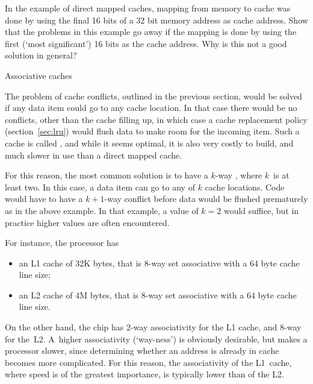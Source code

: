 \begin{exercise}
  In the example of direct mapped caches, mapping from memory to cache
  was done by using the final 16 bits of a 32 bit memory address as
  cache address. Show that the problems in this example go away if the
  mapping is done by using the first (`most significant') 16 bits as
  the cache address. Why is this not a good solution in general?
\end{exercise}

 {Associative caches}
\label{sec:associative}

The problem of cache conflicts, outlined in the previous section, would
be solved if any data item could go to any cache location. In that
case there would be no conflicts, other than the cache filling up, in
which case a cache replacement policy (section~\ref{sec:lru}) would
flush data to make room for the incoming item. Such a cache is called
, and while it seems optimal, it is also
very costly to build, and much slower in use than a direct mapped cache.

For this reason, the most common solution is to have a
$k$-way , where $k$~is at least two. In
this case, a data item can go to any of $k$ cache locations. Code
would have to have a $k+1$-way conflict before data would be flushed
prematurely as in the above example. In that example, a value of $k=2$
would suffice, but in practice higher values are often encountered.

For instance, the 
 processor has
\begin{itemize}
\item an L1 cache of 32K bytes, that is 8-way set associative with a 64
  byte cache line size;
\item an L2 cache of 4M bytes, that is 8-way set associative with a 64
  byte cache line size.
\end{itemize}
On the other hand, the  chip
has 2-way associativity for the L1 cache, and 8-way for
the~L2. A~higher associativity (`way-ness') is obviously desirable,
but makes a processor slower, since determining whether an address is
already in cache becomes more complicated. For this reason, the
associativity of the L1~cache, where speed is of the greatest
importance, is typically lower than of the L2.

